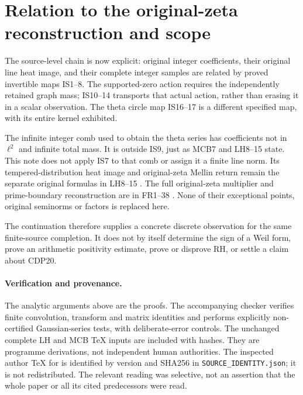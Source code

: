 \documentclass[11pt]{article}
\begin{document}
\section{Relation to the original-zeta reconstruction and scope}
The source-level chain is now explicit: original integer coefficients, their original line heat image, and their complete integer samples are related by proved invertible maps IS1--8. The supported-zero action requires the independently retained graph mass; IS10--14 transports that actual action, rather than erasing it in a scalar observation. The theta circle map IS16--17 is a different specified map, with its entire kernel exhibited.

The infinite integer comb used to obtain the theta series has coefficients not in $\ell^2$ and infinite total mass. It is outside IS9, just as MCB7 and LH8--15 state. This note does not apply IS7 to that comb or assign it a finite line norm. Its tempered-distribution heat image and original-zeta Mellin return remain the separate original formulas in LH8--15 \cite{LH}. The full original-zeta multiplier and prime-boundary reconstruction are in FR1--38 \cite{FR}. None of their exceptional points, original seminorms or factors is replaced here.

The continuation therefore supplies a concrete discrete observation for the same finite-source completion. It does not by itself determine the sign of a Weil form, prove an arithmetic positivity estimate, prove or disprove RH, or settle a claim about CDP20.

\paragraph{Verification and provenance.}
The analytic arguments above are the proofs. The accompanying checker verifies finite convolution, transform and matrix identities and performs explicitly non-certified Gaussian-series tests, with deliberate-error controls. The unchanged complete LH and MCB TeX inputs are included with hashes. They are programme derivations, not independent human authorities. The inspected author TeX for \cite{GRS} is identified by version and SHA256 in \texttt{SOURCE\_IDENTITY.json}; it is not redistributed. The relevant reading was selective, not an assertion that the whole paper or all its cited predecessors were read.
\end{document}
